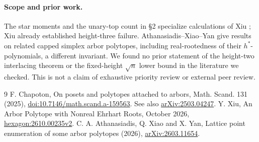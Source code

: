 \documentclass[11pt]{article}
\begin{document}
\paragraph{Scope and prior work.}
The star moments and the unary-top count in \S2 specialize calculations
of Xiu \cite{xiu}; Xiu already established height-three failure.
Athanasiadis--Xiao--Yan \cite{axy} give results on related capped
simplex arbor polytopes, including real-rootedness of their $h^*$-polynomials,
a different invariant. We found no prior statement of the height-two
interlacing theorem or the fixed-height $\sqrt n$ lower bound in the
literature we checked. This is not a claim of exhaustive priority review
or external peer review.
\begin{thebibliography}{9}
 F. Chapoton, On posets and polytopes attached to arbors,
Math. Scand. 131 (2025), \href{https://doi.org/10.7146/math.scand.a-159563}{doi:10.7146/math.scand.a-159563}. See also \href{https://arxiv.org/abs/2503.04247}{arXiv:2503.04247}.
 Y. Xiu, An Arbor Polytope with Nonreal Ehrhart Roots,
October 2026, \href{https://hexagonmath.org/pdf/2610.00235v2}{hexagon:2610.00235v2}.
 C. A. Athanasiadis, Q. Xiao and X. Yan,
Lattice point enumeration of some arbor polytopes (2026),
\href{https://arxiv.org/abs/2603.11654}{arXiv:2603.11654}.
\end{thebibliography}
\end{document}
